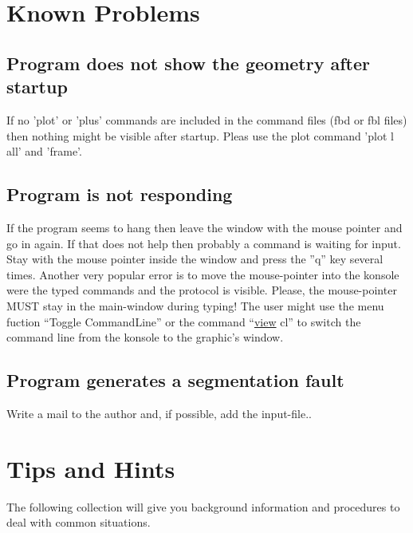 \documentclass{article}
\providecommand{\htmlref}[2]{\hyperref[#2]{#1}}
\begin{document}
\begin{appendix}
\section{\label{Known Problems}Known Problems}
\subsection{\label{Program does not show the geometry after startup}Program does not show the geometry after startup}
If no 'plot' or 'plus' commands are included in the command files (fbd or fbl files) then nothing might be visible after startup. Pleas use the plot command 'plot l all' and 'frame'.

\subsection{\label{Program is not responding}Program is not responding}
If the program seems to hang then leave the window with the mouse pointer and go in again. If that does not help then probably a command is waiting for input. Stay with the mouse pointer inside the window and press the ''q'' key several times. Another very popular error is to move the mouse-pointer into the konsole were the typed commands and the protocol is visible. Please, the mouse-pointer MUST stay in the main-window during typing! The user might use the menu fuction ``Toggle CommandLine'' or the command ``\htmlref{view}{view} cl'' to switch the command line from the konsole to the graphic's window.

\subsection{\label{Program generates a segmentation fault}Program generates a segmentation fault}
Write a mail to the author and, if possible, add the input-file.\cite{cgx}.

\section{\label{Tips and Hints}Tips and Hints}
The following collection will give you background information and procedures to deal with common situations.


\end{appendix}
\end{document}
